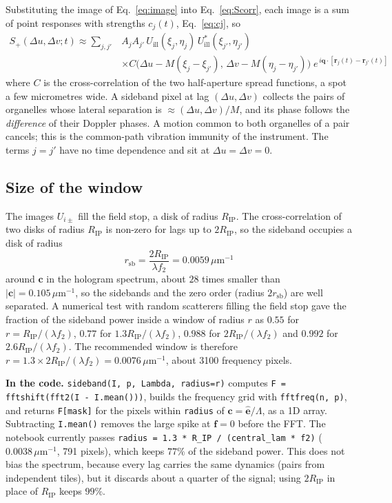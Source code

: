\documentclass[11pt,a4paper]{article}
\newcommand{\vr}{\mathbf{r}}
\newcommand{\vq}{\mathbf{q}}
\newcommand{\ve}{\hat{\mathbf{e}}}
\newcommand{\um}{\,\mu\mathrm{m}}
\newcommand{\ee}{e}
\newcommand{\code}[1]{\texttt{\small #1}}
\newcommand{\incode}[1]{\par\smallskip\noindent\colorbox{black!6}{\parbox{\dimexpr\linewidth-2\fboxsep}{\small\textbf{In the code.} #1}}\par\smallskip}
\begin{document}
Substituting the image of Eq.~\eqref{eq:image} into Eq.~\eqref{eq:Scorr}, each
image is a sum of point responses with strengths $c_j(t)$, Eq.~\eqref{eq:cj},
so
\begin{equation}
  \boxed{
  \begin{aligned}
  S_+(\Delta u,\Delta v;t) \approx \sum_{j,j'} &A_jA_{j'}\,
  U_\mathrm{ill}(\xi_j,\eta_j)\,U^*_\mathrm{ill}(\xi_{j'},\eta_{j'})\\
  &\times C\big(\Delta u - M(\xi_j-\xi_{j'}),\,\Delta v - M(\eta_j-\eta_{j'})\big)\;
  \ee^{\,i\vq\cdot[\vr_j(t)-\vr_{j'}(t)]}
  \end{aligned}}
  \label{eq:Splus}
\end{equation}
where $C$ is the cross-correlation of the two half-aperture spread functions,
a spot a few micrometres wide. A sideband pixel at lag
$(\Delta u,\Delta v)$ collects the pairs of organelles whose lateral
separation is $\approx(\Delta u,\Delta v)/M$, and its phase follows the
\emph{difference} of their Doppler phases. A motion common to both organelles
of a pair cancels; this is the common-path vibration immunity of the
instrument. The terms $j = j'$ have no time dependence and sit at
$\Delta u = \Delta v = 0$.

\subsection{Size of the window}

The images $U_{i\pm}$ fill the field stop, a disk of radius $R_\mathrm{IP}$.
The cross-correlation of two disks of radius $R_\mathrm{IP}$ is non-zero for
lags up to $2R_\mathrm{IP}$, so the sideband occupies a disk of radius
\begin{equation}
  r_\mathrm{sb} = \frac{2R_\mathrm{IP}}{\lambda f_2} = 0.0059\um^{-1}
\end{equation}
around $\mathbf{c}$ in the hologram spectrum, about $28$ times smaller than
$|\mathbf{c}| = 0.105\um^{-1}$, so the sidebands and the zero order (radius
$2r_\mathrm{sb}$) are well separated. A numerical test with random scatterers
filling the field stop gave the fraction of the sideband power inside a
window of radius $r$ as $0.55$ for $r = R_\mathrm{IP}/(\lambda f_2)$, $0.77$
for $1.3R_\mathrm{IP}/(\lambda f_2)$, $0.988$ for $2R_\mathrm{IP}/(\lambda f_2)$
and $0.992$ for $2.6R_\mathrm{IP}/(\lambda f_2)$. The recommended window is
therefore $r = 1.3\times2R_\mathrm{IP}/(\lambda f_2) = 0.0076\um^{-1}$,
about 3100 frequency pixels.

\incode{\code{sideband(I, p, Lambda, radius=r)} computes
\code{F = fftshift(fft2(I - I.mean()))}, builds the frequency grid with
\code{fftfreq(n, p)}, and returns \code{F[mask]} for the pixels within
\code{radius} of $\mathbf{c} = \ve/\Lambda$, as a 1D array. Subtracting
\code{I.mean()} removes the large spike at $\mathbf{f}=0$ before the FFT.
The notebook currently passes \code{radius = 1.3 * R\_IP / (central\_lam * f2)}
($0.0038\um^{-1}$, 791 pixels), which keeps $77\%$ of the sideband power. This
does not bias the spectrum, because every lag carries the same dynamics
(pairs from independent tiles), but it discards about a quarter of the
signal; using $2R_\mathrm{IP}$ in place of $R_\mathrm{IP}$ keeps $99\%$.}
\end{document}
